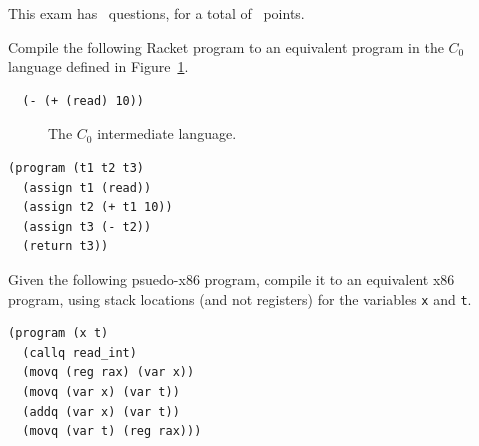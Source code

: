 \documentclass[12pt]{exam}
\newcommand{\itm}[1]{\ensuremath{\mathit{#1}}}
\newcommand{\key}[1]{\texttt{#1}}
\begin{document}
\vspace{20pt}

\begin{center} 
This exam has \numquestions\ questions, for a total of \numpoints\ 
points. 
\end{center} 

\begin{questions}


\question[12] Compile the following Racket program to an equivalent
program in the $C_0$ language defined in Figure~\ref{fig:c0-syntax}.
\begin{lstlisting}
  (- (+ (read) 10))
\end{lstlisting}

\begin{figure}[h]
\centering
\fbox{
\begin{minipage}{0.65\textwidth}
\[
\begin{array}{lcl}
\itm{arg} &::=& \itm{int} \mid \itm{var} \\
\itm{exp} &::=& \itm{arg} \mid (\key{read}) \mid (\key{-}\;\itm{arg}) \mid (\key{+} \; \itm{arg}\;\itm{arg})\\
\itm{stmt} &::=& (\key{assign}~\itm{var}~\itm{exp}) \mid (\key{return}~\itm{arg}) \\
C_0 & ::= & (\key{program}\;(\itm{var}^{*})\;\itm{stmt}^{+})
\end{array}
\]
\end{minipage}
}
\caption{The $C_0$ intermediate language.}
\label{fig:c0-syntax}
\end{figure}


\begin{solution}[1.5in]
\begin{lstlisting}
(program (t1 t2 t3)
  (assign t1 (read))
  (assign t2 (+ t1 10))
  (assign t3 (- t2))
  (return t3))
\end{lstlisting}
\end{solution}

\question[14] Given the following psuedo-x86 program, compile it to an
equivalent x86 program, using stack locations (and not registers) for
the variables \texttt{x} and \texttt{t}.
\begin{lstlisting}
(program (x t)
  (callq read_int)
  (movq (reg rax) (var x))
  (movq (var x) (var t))
  (addq (var x) (var t))
  (movq (var t) (reg rax)))
\end{lstlisting}


\end{questions}
\end{document}
